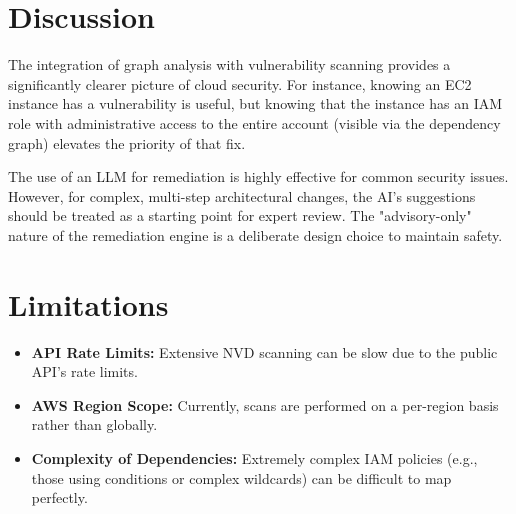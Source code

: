 \section{Discussion}
The integration of graph analysis with vulnerability scanning provides a significantly clearer picture of cloud security. For instance, knowing an EC2 instance has a vulnerability is useful, but knowing that the instance has an IAM role with administrative access to the entire account (visible via the dependency graph) elevates the priority of that fix.

The use of an LLM for remediation is highly effective for common security issues. However, for complex, multi-step architectural changes, the AI's suggestions should be treated as a starting point for expert review. The "advisory-only" nature of the remediation engine is a deliberate design choice to maintain safety.

\section{Limitations}
\begin{itemize}
    \item \textbf{API Rate Limits:} Extensive NVD scanning can be slow due to the public API's rate limits.
    \item \textbf{AWS Region Scope:} Currently, scans are performed on a per-region basis rather than globally.
    \item \textbf{Complexity of Dependencies:} Extremely complex IAM policies (e.g., those using conditions or complex wildcards) can be difficult to map perfectly.
\end{itemize}
